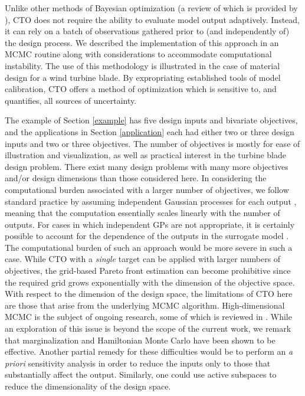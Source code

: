 \documentclass[twocolumn,10pt]{asme2ej}
\begin{document}
Unlike other methods of Bayesian optimization (a review of which is provided by \cite{Shahriari2016}), CTO does not require the ability to evaluate model output adaptively.
%
Instead, it can rely on a batch of observations gathered prior to (and independently of) the design process.
%
We described the implementation of this approach in an MCMC routine along with considerations to accommodate computational instability.
%
The use of this methodology is illustrated in the case of material design for a wind turbine blade. 
%
%
By expropriating established tools of model calibration, CTO offers a method of optimization which is sensitive to, and quantifies, all sources of uncertainty.
%

%
The example of Section \ref{example} has five design inputs and bivariate objectives, and the applications in Section \ref{application} each had either two or three design inputs and two or three objectives.
The number of objectives is mostly for ease of illustration and visualization, as well as practical interest in the turbine blade design problem. There exist many design problems with many more objectives and/or design dimensions than those considered here. In considering the computational burden associated with a larger number of objectives, we follow standard practice by assuming independent Gaussian processes for each output \cite{Picheny2015}, meaning that the computation essentially scales linearly with the number of outputs. For cases in which independent GPs are not appropriate, it is certainly possible to account for the dependence of the outputs in the surrogate model \cite{ContiOHagan10}. The computational burden of such an approach would be more severe in such a case. While CTO with a {\em single} target can be applied with larger numbers of objectives, the grid-based Pareto front estimation can become prohibitive since the required grid grows exponentially with the dimension of the objective space. With respect to the dimension of the design space, the limitations of CTO here are those that arise from the underlying MCMC algorithm. High-dimensional MCMC is the subject of ongoing research, some of which is reviewed in \cite{SaibabaEtAl19}. While an exploration of this issue is beyond the scope of the current work, we remark that marginalization and Hamiltonian Monte Carlo have been shown to be effective. Another partial remedy for these difficulties would be to perform an \textit{a priori} sensitivity analysis in order to reduce the inputs only to those that substantially affect the output. Similarly, one could use active subspaces \cite{Constantine2015} to reduce the dimensionality of the design space.
\end{document}
